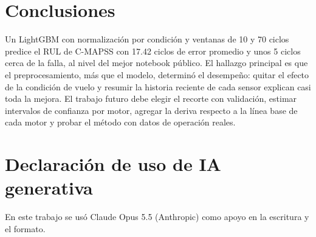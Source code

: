 \documentclass[conference]{IEEEtran}
\begin{document}
\section{Conclusiones}

Un LightGBM con normalización por condición y ventanas de 10 y 70 ciclos predice el RUL de C-MAPSS con 17.42 ciclos de error promedio y unos 5 ciclos cerca de la falla, al nivel del mejor notebook público. El hallazgo principal es que el preprocesamiento, más que el modelo, determinó el desempeño: quitar el efecto de la condición de vuelo y resumir la historia reciente de cada sensor explican casi toda la mejora. El trabajo futuro debe elegir el recorte con validación, estimar intervalos de confianza por motor, agregar la deriva respecto a la línea base de cada motor y probar el método con datos de operación reales.

\section*{Declaración de uso de IA generativa}
En este trabajo se usó Claude Opus 5.5 (Anthropic) como apoyo en la escritura y el formato. 
\end{document}
